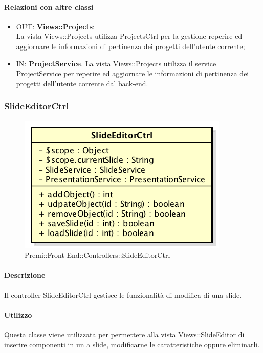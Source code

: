 	\paragraph{Relazioni con altre classi}
	\begin{itemize}
	  \item OUT: \textbf{Views::Projects}:\\
		La vista Views::Projects utilizza ProjectsCtrl per la gestione reperire ed aggiornare le informazioni di pertinenza dei progetti dell'utente corrente;	
	  \item IN: \textbf{ProjectService}.
		La vista Views::Projects utilizza il service ProjectService per reperire ed aggiornare le informazioni di pertinenza dei progetti dell'utente corrente dal back-end.
	\end{itemize}
	
\newpage
\subsubsection{SlideEditorCtrl}
\begin{figure}[h]
	\centering
	\includegraphics[width=0.5\linewidth]{img/premi_front_end_controllers_slideeditorctrl}
	\caption[Premi::Front-End::Controllers::SlideEditorCtrl]{Premi::Front-End::Controllers::SlideEditorCtrl}
\end{figure}
	\paragraph{Descrizione}
	Il controller SlideEditorCtrl gestisce le funzionalità di modifica di una slide.
	
	\paragraph{Utilizzo}
	Questa classe viene utilizzata per permettere alla vista Views::SlideEditor di inserire componenti in un a slide, modificarne le caratteristiche oppure eliminarli.\\
